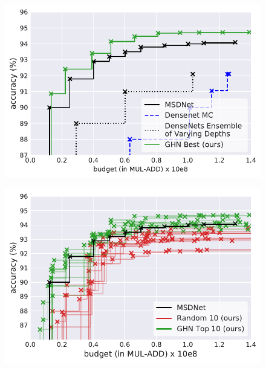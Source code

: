 \begin{figure}[t]
\vspace{-0.5cm}
\centering
\begin{minipage}{.48\textwidth}
  \centering
  \includegraphics[width=0.8\linewidth]{figures/anytime_compare.pdf}
\label{table:Results4}
  \label{fig:test1}
\end{minipage}%
\begin{minipage}{.48\textwidth}
  \centering
  \includegraphics[width=0.8\linewidth]{figures/anytime_randoms.pdf}
  \label{fig:test2}
\end{minipage}
\end{figure}
\fi